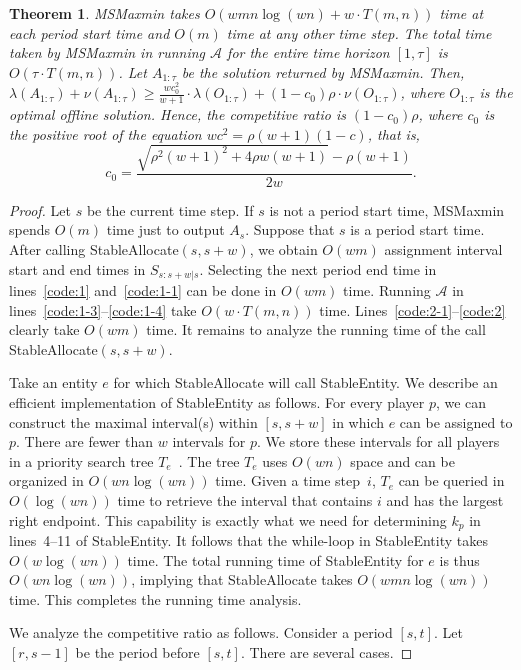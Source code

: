 \documentclass[11pt,a4paper]{article}
\renewcommand{\geq}{\geqslant}
\newtheorem{theorem}{Theorem}[section]
\begin{document}
\begin{theorem}
	\label{thm:main}
		\emph{MSMaxmin} takes $O(wmn\log (wn) + w \cdot T(m,n))$ time at each period start time and $O(m)$ time at any other time step.  The total time taken by \emph{MSMaxmin} in running $\mathcal{A}$ for the entire time horizon $[1,\tau]$ is $O(\tau \cdot T(m,n))$.  Let $A_{1:\tau}$ be the solution returned by \emph{MSMaxmin}.  Then, $\lambda(A_{1:\tau}) + \nu(A_{1:\tau}) \geq \frac{wc_0^2}{w+1}\cdot\lambda(O_{1:\tau}) + (1-c_0)\rho \cdot \nu(O_{1:\tau})$, where $O_{1:\tau}$ is the optimal offline solution.  Hence, the competitive ratio is $(1-c_0)\rho$, where $c_0$ is the positive root of the equation $wc^2 = \rho (w+1)(1-c)$, that is, 
	\[
	c_0 = \frac{\sqrt{\rho^2(w+1)^2 + 4\rho w(w+1)} - \rho(w+1)}{2w}.
	\]
\end{theorem}
\begin{proof}
Let $s$ be the current time step.  If $s$ is not a period start time, MSMaxmin spends $O(m)$ time just to output $A_s$.  Suppose that $s$ is a period start time.   After calling StableAllocate$(s,s+w)$, we obtain $O(wm)$ assignment interval start and end times in $S_{s:s+w|s}$.  Selecting the next period end time in lines~\ref{code:1} and~\ref{code:1-1} can be done in $O(wm)$ time.  Running $\mathcal{A}$ in lines~\ref{code:1-3}--\ref{code:1-4} take $O(w \cdot T(m,n))$ time.  Lines~\ref{code:2-1}--\ref{code:2} clearly take $O(wm)$ time.  It remains to analyze the running time of the call StableAllocate$(s,s+w)$.  

Take an entity $e$ for which StableAllocate will call StableEntity.  We describe an efficient implementation of StableEntity as follows.  For every player $p$, we can construct the maximal interval(s) within $[s,s+w]$ in which $e$ can be assigned to $p$.  There are fewer than $w$ intervals for $p$.   We store these intervals for all players in a priority search tree $T_e$~\cite{mccrieght85}.  The tree $T_e$ uses $O(wn)$ space and can be organized in $O(wn\log (wn))$ time.  Given a time step~$i$, $T_e$ can be queried in $O(\log(wn))$ time to retrieve the interval that contains $i$ and has the largest right endpoint.  This capability is exactly what we need for determining $k_p$ in lines~4--11 of StableEntity.  It follows that the while-loop in StableEntity takes $O(w\log(wn))$ time.  The total running time of StableEntity for $e$ is thus $O(wn\log(wn))$, implying that StableAllocate takes $O(wmn\log(wn))$ time.  This completes the running time analysis.

We analyze the competitive ratio as follows.  Consider a period $[s,t]$.  Let $[r,s-1]$ be the period before $[s,t]$.  There are several cases.


\end{proof}
\end{document}
